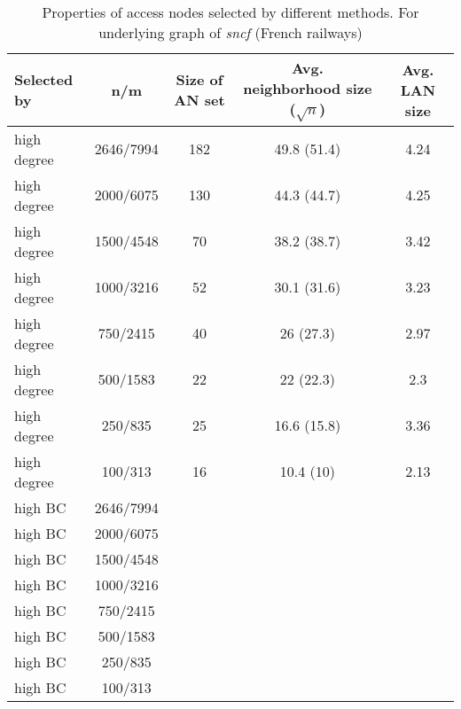 	\begin{table}[h!]{
		\scriptsize
	    \begin{tabular}{l|c|c|c|c}
		\hline
			\rowcolor{tablehead}
	           	\textbf{Selected by} & 
	           	\textbf{n/m} &
	           	\textbf{Size of AN set} &
	           	\textbf{Avg. neighborhood size} ($\sqrt{n}$) &
	           	\textbf{Avg. LAN size} \\
	        \hline
			high degree & 2646/7994 & 182 & 49.8 (51.4) & 4.24 \\
			high degree & 2000/6075 & 130 & 44.3 (44.7) & 4.25 \\
			high degree & 1500/4548 & 70 & 38.2 (38.7) & 3.42 \\
			high degree & 1000/3216 & 52 & 30.1 (31.6) & 3.23 \\
			high degree & 750/2415 & 40 & 26 (27.3) & 2.97 \\
			high degree & 500/1583 & 22 & 22 (22.3) & 2.3 \\
			high degree & 250/835 & 25 & 16.6 (15.8) & 3.36 \\
			high degree & 100/313 & 16 & 10.4 (10) & 2.13 \\
			high BC & 2646/7994 &  &  &  \\
			high BC & 2000/6075 &  &  &  \\
			high BC & 1500/4548 &  &  &  \\
			high BC & 1000/3216 &  &  &  \\
			high BC & 750/2415 &  &  &  \\
			high BC & 500/1583 &  &  &  \\
			high BC & 250/835 &  &  &  \\
			high BC & 100/313 &  &  &  \\
	        \end{tabular}}
		\caption{\label{tab:accnodessncf} Properties of access nodes selected by different methods. For underlying graph of \textit{sncf} (French railways)}
	        \normalsize
	\end{table}
	
